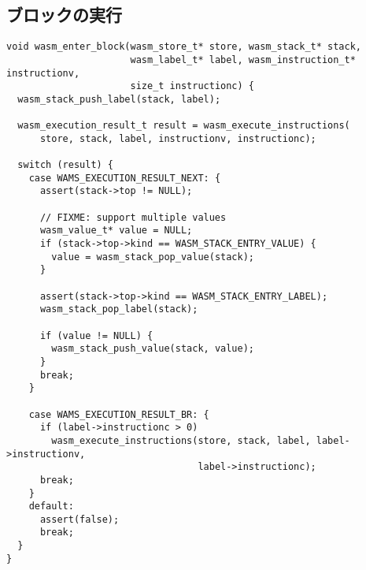 \subsection{ブロックの実行}
\label{subsec:enter_block}
\begin{lstlisting}[caption=ブロックの実行,label=lst:parse_sleb128]
void wasm_enter_block(wasm_store_t* store, wasm_stack_t* stack,
                      wasm_label_t* label, wasm_instruction_t* instructionv,
                      size_t instructionc) {
  wasm_stack_push_label(stack, label);

  wasm_execution_result_t result = wasm_execute_instructions(
      store, stack, label, instructionv, instructionc);

  switch (result) {
    case WAMS_EXECUTION_RESULT_NEXT: {
      assert(stack->top != NULL);

      // FIXME: support multiple values
      wasm_value_t* value = NULL;
      if (stack->top->kind == WASM_STACK_ENTRY_VALUE) {
        value = wasm_stack_pop_value(stack);
      }

      assert(stack->top->kind == WASM_STACK_ENTRY_LABEL);
      wasm_stack_pop_label(stack);

      if (value != NULL) {
        wasm_stack_push_value(stack, value);
      }
      break;
    }

    case WAMS_EXECUTION_RESULT_BR: {
      if (label->instructionc > 0)
        wasm_execute_instructions(store, stack, label, label->instructionv,
                                  label->instructionc);
      break;
    }
    default:
      assert(false);
      break;
  }
}
\end{lstlisting}
